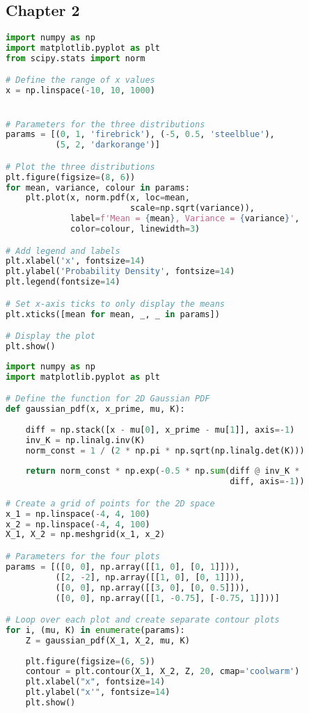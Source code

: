 \documentclass[12pt,a4paper]{article}
\begin{document}
\subsection{ Chapter 2}
\label{Chapter 2}

\vspace{10pt}
\begin{lstlisting}[language=python, caption={Code of the Creation of Figure \ref{fig:NormDist_diffmusigma}}]
import numpy as np
import matplotlib.pyplot as plt
from scipy.stats import norm

# Define the range of x values
x = np.linspace(-10, 10, 1000)


# Parameters for the three distributions
params = [(0, 1, 'firebrick'), (-5, 0.5, 'steelblue'),
          (5, 2, 'darkorange')]  

# Plot the three distributions
plt.figure(figsize=(8, 6))
for mean, variance, colour in params:
    plt.plot(x, norm.pdf(x, loc=mean,
                         scale=np.sqrt(variance)),
             label=f'Mean = {mean}, Variance = {variance}',
             color=colour, linewidth=3)

# Add legend and labels
plt.xlabel('x', fontsize=14)
plt.ylabel('Probability Density', fontsize=14)
plt.legend(fontsize=14)

# Set x-axis ticks to only display the means
plt.xticks([mean for mean, _, _ in params])

# Display the plot
plt.show()
\end{lstlisting}

\vspace{10pt}
\begin{lstlisting}[language=python, caption={Code of the Creation of Figure \ref{fig:contour plots}}]
import numpy as np
import matplotlib.pyplot as plt

# Define the function for 2D Gaussian PDF
def gaussian_pdf(x, x_prime, mu, K):
    
    diff = np.stack([x - mu[0], x_prime - mu[1]], axis=-1)
    inv_K = np.linalg.inv(K)
    norm_const = 1 / (2 * np.pi * np.sqrt(np.linalg.det(K)))
    
    return norm_const * np.exp(-0.5 * np.sum(diff @ inv_K *
                                             diff, axis=-1))

# Create a grid of points for the 2D space
x_1 = np.linspace(-4, 4, 100)
x_2 = np.linspace(-4, 4, 100)
X_1, X_2 = np.meshgrid(x_1, x_2)

# Parameters for the four plots
params = [([0, 0], np.array([[1, 0], [0, 1]])), 
          ([2, -2], np.array([[1, 0], [0, 1]])),  
          ([0, 0], np.array([[3, 0], [0, 0.5]])),  
          ([0, 0], np.array([[1, -0.75], [-0.75, 1]]))]  

# Loop over each plot and create separate contour plots
for i, (mu, K) in enumerate(params):
    Z = gaussian_pdf(X_1, X_2, mu, K)
    
    plt.figure(figsize=(6, 5))
    contour = plt.contour(X_1, X_2, Z, 20, cmap='coolwarm')  
    plt.xlabel("x", fontsize=14)
    plt.ylabel("x'", fontsize=14)
    plt.show()
\end{lstlisting}
\end{document}
